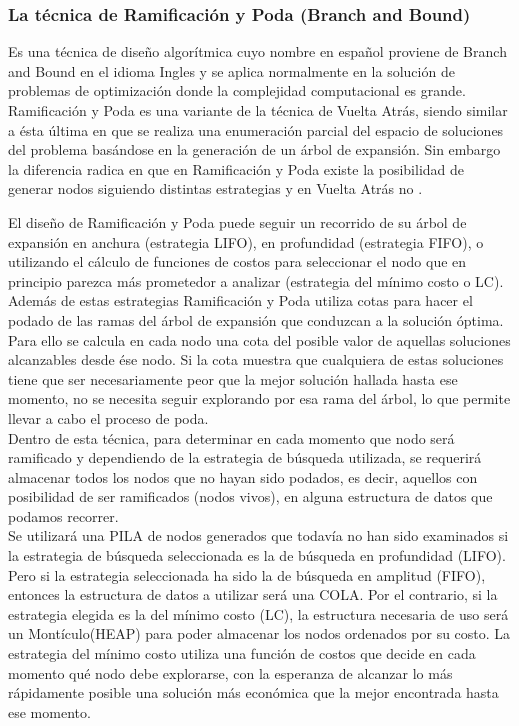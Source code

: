 \subsubsection{La técnica de Ramificación y Poda (Branch and 
Bound)}
Es una técnica de diseño algorítmica cuyo nombre en español proviene de Branch and 
Bound en el idioma Ingles y se aplica normalmente en la solución de problemas de 
optimización donde la complejidad computacional es grande. Ramificación y Poda es 
una variante de la técnica de Vuelta Atrás, siendo similar a ésta última en que se realiza 
una enumeración parcial del espacio de soluciones del problema basándose en la 
generación de un árbol de expansión. Sin embargo la diferencia radica en que en 
Ramificación y Poda existe la posibilidad de generar nodos siguiendo distintas 
estrategias y en Vuelta Atrás no \cite{[GUE99]}. 
 
\hspace*{1cm}El diseño de Ramificación y Poda puede seguir un recorrido de su árbol de expansión en anchura (estrategia LIFO), en profundidad (estrategia FIFO), o utilizando el cálculo de funciones de costos para seleccionar el nodo que en principio parezca más prometedor a analizar (estrategia del mínimo costo o LC).\\

\hspace*{1cm}Además de estas estrategias Ramificación y Poda utiliza cotas para hacer el podado de las ramas del árbol de expansión que conduzcan a la solución óptima. Para ello se calcula en cada nodo una cota del posible valor de aquellas soluciones alcanzables desde ése nodo. Si la cota muestra que cualquiera de estas soluciones tiene que ser necesariamente peor que la mejor solución hallada hasta ese momento, no se necesita seguir explorando por esa rama del árbol, lo que permite llevar a cabo el proceso de poda.\\ 
 
\hspace*{1cm}Dentro de esta técnica, para determinar en cada momento que nodo será ramificado y 
dependiendo de la estrategia de búsqueda utilizada, se requerirá almacenar todos los 
nodos que no hayan sido podados, es decir, aquellos con posibilidad de ser ramificados (nodos vivos), en alguna estructura de datos que podamos recorrer.\\ 
 
\hspace*{1cm}Se utilizará una PILA de nodos generados que todavía no han sido examinados si la 
estrategia de búsqueda seleccionada es la de búsqueda en profundidad (LIFO). Pero si 
la estrategia seleccionada ha sido la de búsqueda en amplitud (FIFO), entonces la 
estructura de datos a utilizar será una COLA. Por el contrario, si la estrategia elegida es la del mínimo costo (LC), la estructura necesaria de uso será un Montículo(HEAP) para poder almacenar los nodos ordenados por su costo. La estrategia del mínimo costo utiliza una función de costos que decide en cada momento qué nodo debe explorarse, con la esperanza de alcanzar lo más rápidamente posible una solución más económica que la mejor encontrada hasta ese momento. \\

